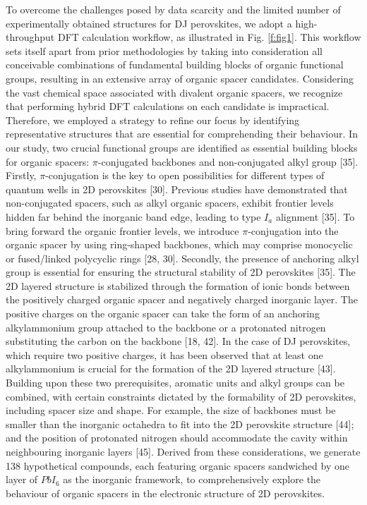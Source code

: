 To overcome the challenges posed by data scarcity and the limited number of experimentally obtained structures for DJ perovskites, we adopt a high-throughput DFT calculation workflow, as illustrated in Fig. \ref{f:fig1}. This workflow sets itself apart from prior methodologies by taking into consideration all conceivable combinations of fundamental building blocks of organic functional groups, resulting in an extensive array of organic spacer candidates. Considering the vast chemical space associated with divalent organic spacers, we recognize that performing hybrid DFT calculations on each candidate is impractical. Therefore, we employed a strategy to refine our focus by identifying representative structures that are essential for comprehending their behaviour. In our study, two crucial functional groups are identified as essential building blocks for organic spacers: $\pi$-conjugated backbones and non-conjugated alkyl group [35]. Firstly, $\pi$-conjugation is the key to open possibilities for different types of quantum wells in 2D perovskites [30]. Previous studies have demonstrated that non-conjugated spacers, such as alkyl organic spacers, exhibit frontier levels hidden far behind the inorganic band edge, leading to type $I_a$ alignment [35]. To bring forward the organic frontier levels, we introduce $\pi$-conjugation into the organic spacer by using ring-shaped backbones, which may comprise monocyclic or fused/linked polycyclic rings [28, 30]. Secondly, the presence of anchoring alkyl group is essential for ensuring the structural stability of 2D perovskites [35]. The 2D layered structure is stabilized through the formation of ionic bonds between the positively charged organic spacer and negatively charged inorganic layer. The positive charges on the organic spacer can take the form of an anchoring alkylammonium group attached to the backbone or a protonated nitrogen substituting the carbon on the backbone [18, 42]. In the case of DJ perovskites, which require two positive charges, it has been observed that at least one alkylammonium is crucial for the formation of the 2D layered structure [43]. Building upon these two prerequisites, aromatic units and alkyl groups can be combined, with certain constraints dictated by the formability of 2D perovskites, including spacer size and shape. For example, the size of backbones must be smaller than the inorganic octahedra to fit into the 2D perovskite structure [44]; and the position of protonated nitrogen should accommodate the cavity within neighbouring inorganic layers [45]. Derived from these considerations, we generate 138 hypothetical compounds, each featuring organic spacers sandwiched by one layer of $PbI_6$ as the inorganic framework, to comprehensively explore the behaviour of organic spacers in the electronic structure of 2D perovskites. 

